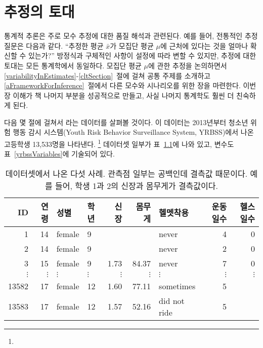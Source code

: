 \chapter{추정의 토대}
\label{foundationsForInference}

통계적 추론은 주로 모수 추정에 대한 품질 해석과 관련된다. 예를 들어, 전통적인 추정 질문은 다음과 같다. ``추정한 평균 $\bar{x}$가 모집단 평균 $\mu$에 근처에 있다는 것을 얼마나 확신할 수 있는가?''  방정식과 구체적인 사항이 설정에 따라 변할 수 있지만, 추정에 대한 토대는 모든 통계학에서 동일하다. 모집단 평균 $\mu$에 관한 추정을 논의하면서 \ref{variabilityInEstimates}-\ref{cltSection}~절에 걸쳐 공통 주제를 소개하고 \ref{aFrameworkForInference}~절에서 다른 모수와 시나리오를 위한 장을 마련한다. 이번 장 이해가 책 나머지 부분을 성공적으로 만들고, 사실 나머지 통계학도 훨씬 더 친숙하게 된다.


다음 몇 절에 걸쳐서 라는 데이터를 살펴볼 것이다. 이 데이터는 2013년부터 청소년 위험 행동 감시 시스템(Youth Risk Behavior Surveillance System, YRBSS)에서 나온 고등학생 13,533명을 나타낸다. \footnote{} 데이터셋 일부가 표~\ref{yrbssDF}에 나와 있고, 변수도 표~\ref{yrbssVariables}에 기술되어 있다.

\begin{table}[h]
\centering
\begin{tabular}{rrllrrlrr}
  \hline
ID & 연령 & 성별 & 학년 & 신장 & 몸무게 & 헬멧착용 & 운동일수 & 헬스일수 \\ 
  \hline
1 &  14 & female & 9 &  &  & never &   4 &   0 \\ 
  2 &  14 & female & 9 &  &  & never &   2 &   0 \\ 
  3 &  15 & female & 9 & 1.73 & 84.37 & never &   7 &   0 \\ 
  $\vdots$ & $\vdots$ & $\vdots$ & $\vdots$ & $\vdots$ & $\vdots$ & $\vdots$ & $\vdots$ & $\vdots$ \\
  13582 &  17 & female & 12 & 1.60 & 77.11 & sometimes &   5 &  \\ 
  13583 &  17 & female & 12 & 1.57 & 52.16 & did not ride &   5 &  \\ 
  \hline
\end{tabular}
\caption{ 데이터셋에서 나온 다섯 사례. 관측점 일부는 공백인데 결측값 때문이다. 예를 들어, 학생 1과 2의 신장과 몸무게가 결측값이다. \textC{\vspace{-2mm}}}
\label{yrbssDF}
\end{table}

